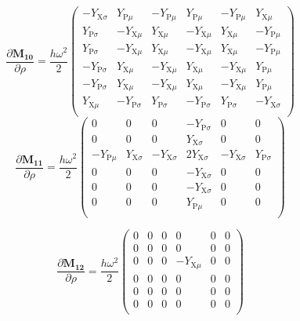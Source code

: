 \documentclass[a4paper,10pt]{article}
\begin{document}
\begin{equation}
\frac{\partial\mathbf{M_{10}}}{\partial \rho} = \frac{h \omega^2}{2}\left(
\begin{array}{cccccc}
 -Y_{\text{X$\sigma $}} & Y_{\text{P$\mu $}} & -Y_{\text{P$\mu $}} & Y_{\text{P$\mu $}} & -Y_{\text{P$\mu $}} &
   Y_{\text{X$\mu $}} \\
 Y_{\text{P$\sigma $}} & -Y_{\text{X$\mu $}} & Y_{\text{X$\mu $}} & -Y_{\text{X$\mu $}} & Y_{\text{X$\mu $}} &
   -Y_{\text{P$\mu $}} \\
 Y_{\text{P$\sigma $}} & -Y_{\text{X$\mu $}} & Y_{\text{X$\mu $}} & -Y_{\text{X$\mu $}} & Y_{\text{X$\mu $}} &
   -Y_{\text{P$\mu $}} \\
 -Y_{\text{P$\sigma $}} & Y_{\text{X$\mu $}} & -Y_{\text{X$\mu $}} & Y_{\text{X$\mu $}} & -Y_{\text{X$\mu $}} &
   Y_{\text{P$\mu $}} \\
 -Y_{\text{P$\sigma $}} & Y_{\text{X$\mu $}} & -Y_{\text{X$\mu $}} & Y_{\text{X$\mu $}} & -Y_{\text{X$\mu $}} &
   Y_{\text{P$\mu $}} \\
 Y_{\text{X$\mu $}} & -Y_{\text{P$\sigma $}} & Y_{\text{P$\sigma $}} & -Y_{\text{P$\sigma $}} & Y_{\text{P$\sigma
   $}} & -Y_{\text{X$\sigma $}} \\
\end{array}
\right)
\end{equation}
\begin{equation}
\frac{\partial\mathbf{M_{11}}}{\partial \rho} =\frac{h \omega^2}{2}\left(
\begin{array}{cccccc}
 0 & 0 & 0 & -Y_{\text{P$\sigma $}} & 0 & 0 \\
 0 & 0 & 0 & Y_{\text{X$\sigma $}} & 0 & 0 \\
 -Y_{\text{P$\mu $}} & Y_{\text{X$\sigma $}} & -Y_{\text{X$\sigma $}} & 2 Y_{\text{X$\sigma $}} &
   -Y_{\text{X$\sigma $}} & Y_{\text{P$\sigma $}} \\
 0 & 0 & 0 & -Y_{\text{X$\sigma $}} & 0 & 0 \\
 0 & 0 & 0 & -Y_{\text{X$\sigma $}} & 0 & 0 \\
 0 & 0 & 0 & Y_{\text{P$\mu $}} & 0 & 0 \\
\end{array}
\right) \end{equation}

\begin{equation}
\frac{\partial\mathbf{M_{12}}}{\partial \rho} =\frac{h \omega^2}{2}\left(
\begin{array}{cccccc}
 0 & 0 & 0 & 0 & 0 & 0 \\
 0 & 0 & 0 & 0 & 0 & 0 \\
 0 & 0 & 0 & -Y_{\text{X$\mu $}} & 0 & 0 \\
 0 & 0 & 0 & 0 & 0 & 0 \\
 0 & 0 & 0 & 0 & 0 & 0 \\
 0 & 0 & 0 & 0 & 0 & 0 \\
\end{array}
\right) \end{equation}
\end{document}
